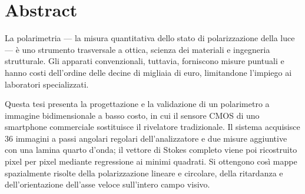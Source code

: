 \documentclass{Configuration_Files/PoliMi3i_thesis}
\begin{document}


\pagestyle{empty} %
\frontmatter %


\startpreamble
\setcounter{page}{1}

\chapter*{Abstract}
La polarimetria --- la misura quantitativa dello stato di polarizzazione della luce --- è uno strumento trasversale a ottica, scienza dei materiali e ingegneria strutturale. Gli apparati convenzionali, tuttavia, forniscono misure puntuali e hanno costi dell'ordine delle decine di migliaia di euro, limitandone l'impiego ai laboratori specializzati.

Questa tesi presenta la progettazione e la validazione di un polarimetro a immagine bidimensionale a basso costo, in cui il sensore CMOS di uno smartphone commerciale sostituisce il rivelatore tradizionale. Il sistema acquisisce 36 immagini a passi angolari regolari dell'analizzatore e due misure aggiuntive con una lamina quarto d'onda; il vettore di Stokes completo viene poi ricostruito pixel per pixel mediante regressione ai minimi quadrati. Si ottengono cos\`i mappe spazialmente risolte della polarizzazione lineare e circolare, della ritardanza e dell'orientazione dell'asse veloce sull'intero campo visivo.
\end{document}
